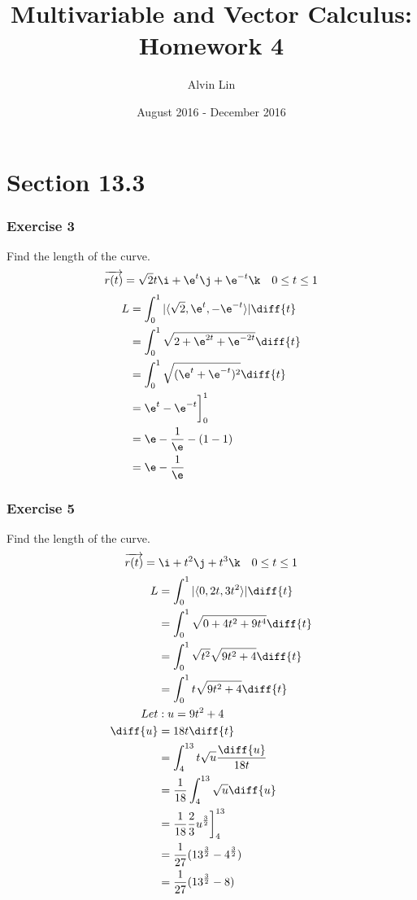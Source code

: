 \documentclass{math}
\title{Multivariable and Vector Calculus: Homework 4}
\author{Alvin Lin}
\date{August 2016 - December 2016}
\begin{document}
\maketitle

\section*{Section 13.3}

\subsubsection*{Exercise 3}
Find the length of the curve.
\[ \overrightarrow{r(t)} = \sqrt{2}t\i+\e^t\j+\e^{-t}\k \quad 0\le t\le 1 \]
\begin{align*}
  L &= \int_{0}^{1}|\langle\sqrt{2},\e^t,-\e^{-t}\rangle|\diff{t} \\
  &= \int_{0}^{1}\sqrt{2+\e^{2t}+\e^{-2t}}\diff{t} \\
  &= \int_{0}^{1}\sqrt{(\e^t+\e^{-t})^2}\diff{t} \\
  &= \e^t-\e^{-t}\bigg]_{0}^{1} \\
  &= \e-\frac{1}{\e}-(1-1) \\
  &= \e-\frac{1}{\e}
\end{align*}

\subsubsection*{Exercise 5}
Find the length of the curve.
\[ \overrightarrow{r(t)} = \i+t^2\j+t^3\k \quad 0\le t\le 1 \]
\begin{align*}
  L &= \int_{0}^{1}|\langle0,2t,3t^2\rangle|\diff{t} \\
  &= \int_{0}^{1}\sqrt{0+4t^2+9t^4}\diff{t} \\
  &= \int_{0}^{1}\sqrt{t^2}\sqrt{9t^2+4}\diff{t} \\
  &= \int_{0}^{1}t\sqrt{9t^2+4}\diff{t} \\
  Let &: u = 9t^2+4 \\
  \diff{u} &= 18t\diff{t} \\
  &= \int_{4}^{13}t\sqrt{u}\frac{\diff{u}}{18t} \\
  &= \frac{1}{18}\int_{4}^{13}\sqrt{u}\diff{u} \\
  &= \frac{1}{18}\frac{2}{3}u^{\frac{3}{2}}\bigg]_{4}^{13} \\
  &= \frac{1}{27}(13^{\frac{3}{2}}-4^{\frac{3}{2}}) \\
  &= \frac{1}{27}(13^{\frac{3}{2}}-8)
\end{align*}
\end{document}
